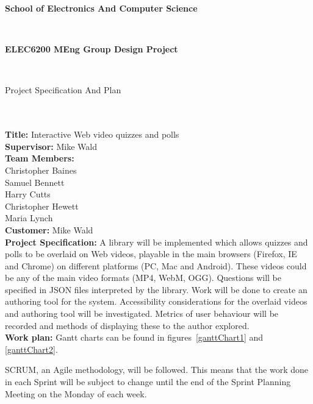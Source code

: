 \documentclass[12pt,a4paper]{article}
\begin{document}

\begin{Large}
\textbf{School of Electronics And Computer Science
}\end{Large}\\

\begin{Large}
\textbf{ELEC6200    MEng Group Design Project
}\end{Large}\\

\begin{Large}
Project Specification And Plan
\end{Large}\\\\

\textbf{Title:}
Interactive Web video quizzes and polls\\

\textbf{Supervisor:}	
Mike Wald\\

\textbf{Team Members:}\\
Christopher Baines\\
Samuel Bennett\\
Harry Cutts\\
Christopher Hewett\\
Maria Lynch\\

\textbf{Customer:}
Mike Wald\\

\textbf{Project Specification:}
A library will be implemented which allows quizzes and polls to be overlaid on Web videos, playable in the main browsers (Firefox, IE and Chrome) on different platforms (PC, Mac and Android). These videos could be any of the main video formats (MP4, WebM, OGG). Questions will be specified in JSON files interpreted by the library. Work will be done to create an authoring tool for the system. Accessibility considerations for the overlaid videos and authoring tool will be investigated. Metrics of user behaviour will be recorded and methods of displaying these to the author explored.
\\

\textbf{Work plan:}
Gantt charts can be found in figures~\ref{ganttChart1} and \ref{ganttChart2}.

SCRUM, an Agile methodology, will be followed. This means that the work done in each Sprint will be subject to change until the end of the Sprint Planning Meeting on the Monday of each week.
\end{document}
